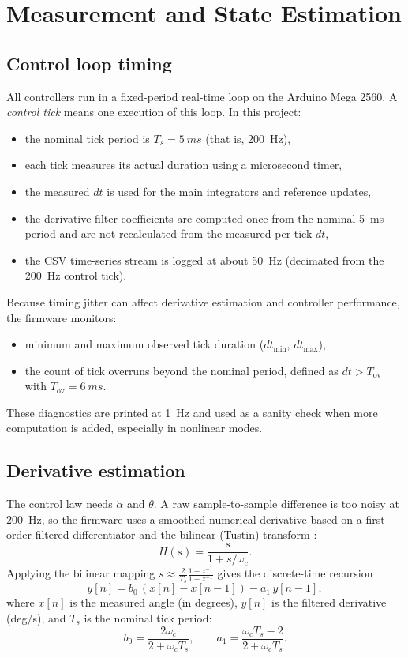 \section{Measurement and State Estimation}
\label{ch:measurement}

\subsection{Control loop timing}
All controllers run in a fixed-period real-time loop on the Arduino Mega 2560. A \emph{control tick} means one execution of this loop. In this project:
\begin{itemize}
  \item the nominal tick period is $T_s=\SI{5}{ms}$ (that is, \SI{200}{Hz}),
  \item each tick measures its actual duration using a microsecond timer,
  \item the measured $dt$ is used for the main integrators and reference updates,
  \item the derivative filter coefficients are computed once from the nominal \SI{5}{ms} period and are not recalculated from the measured per-tick $dt$,
  \item the CSV time-series stream is logged at about \SI{50}{Hz} (decimated from the \SI{200}{Hz} control tick).
\end{itemize}

Because timing jitter can affect derivative estimation and controller performance, the firmware monitors:
\begin{itemize}
  \item minimum and maximum observed tick duration ($dt_{\min}$, $dt_{\max}$),
  \item the count of tick overruns beyond the nominal period, defined as $dt > T_{\mathrm{ov}}$ with $T_{\mathrm{ov}}=\SI{6}{ms}$.
\end{itemize}
These diagnostics are printed at \SI{1}{Hz} and used as a sanity check when more computation is added, especially in nonlinear modes.

\subsection{Derivative estimation}
The control law needs $\dot{\alpha}$ and $\dot{\theta}$. A raw sample-to-sample difference is too noisy at \SI{200}{Hz}, so the firmware uses a smoothed numerical derivative based on a first-order filtered differentiator and the bilinear (Tustin) transform \cite{Astrom2008,ST_RIP_2019}:
\[
H(s) = \frac{s}{1+s/\omega_c}.
\]
Applying the bilinear mapping $s \approx \frac{2}{T_s}\frac{1-z^{-1}}{1+z^{-1}}$ gives the discrete-time recursion
\[
y[n] = b_0\,(x[n]-x[n-1]) - a_1\,y[n-1],
\]
where $x[n]$ is the measured angle (in degrees), $y[n]$ is the filtered derivative (deg/s), and $T_s$ is the nominal tick period:
\[
b_0 = \frac{2\omega_c}{2+\omega_c T_s},\qquad
a_1 = \frac{\omega_c T_s - 2}{2+\omega_c T_s}.
\]

